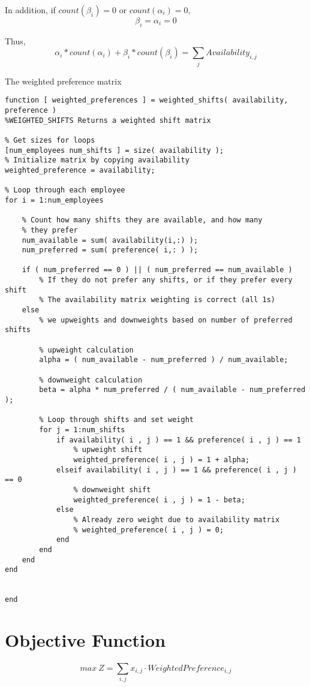 In addition, if $count(\beta_{i})=0$ or $count(\alpha_{i})=0$,
$$ \beta_{i} = \alpha_{i} = 0 $$ 

Thus, 
$$ \alpha_{i}*count(\alpha_{i}) +\beta_{i} * count(\beta_{i}) = \sum\limits_{j}Availability_{i,j}$$

The weighted preference matrix 

\begin{verbatim}
function [ weighted_preferences ] = weighted_shifts( availability, preference )
%WEIGHTED_SHIFTS Returns a weighted shift matrix 

% Get sizes for loops
[num_employees num_shifts ] = size( availability );
% Initialize matrix by copying availability 
weighted_preference = availability;

% Loop through each employee
for i = 1:num_employees

    % Count how many shifts they are available, and how many 
	% they prefer
	num_available = sum( availability(i,:) );
	num_preferred = sum( preference( i,: ) );

	if ( num_preferred == 0 ) || ( num_preferred == num_available )
		% If they do not prefer any shifts, or if they prefer every shift
		% The availability matrix weighting is correct (all 1s)
	else 
		% we upweights and downweights based on number of preferred shifts 

		% upweight calculation
		alpha = ( num_available - num_preferred ) / num_available;
		
		% downweight calculation
		beta = alpha * num_preferred / ( num_available - num_preferred );
		
		% Loop through shifts and set weight
		for j = 1:num_shifts
			if availability( i , j ) == 1 && preference( i , j ) == 1
				% upweight shift
				weighted_preference( i , j ) = 1 + alpha;
			elseif availability( i , j ) == 1 && preference( i , j ) == 0
				% downweight shift
				weighted_preference( i , j ) = 1 - beta;
			else
				% Already zero weight due to availability matrix
				% weighted_preference( i , j ) = 0;
			end
		end
	end
end


end

\end{verbatim}

\section{Objective Function}

$$ max~Z = \sum\limits_{i,j} x_{i,j} \cdot WeightedPreference_{i,j}$$

